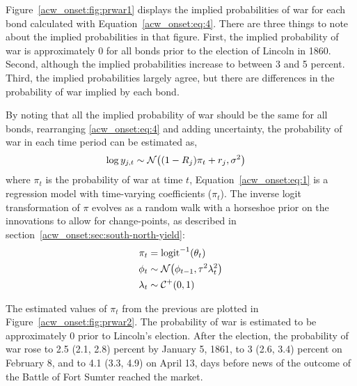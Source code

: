 Figure~\ref{acw_onset:fig:prwar1} displays the implied probabilities of war for each bond calculated with Equation~\eqref{acw_onset:eq:4}.
There are three things to note about the implied probabilities in that figure.
First, the implied probability of war is approximately 0 for all bonds prior to the election of Lincoln in 1860.
Second, although the implied probabilities increase to between 3 and 5 percent.
Third, the implied probabilities largely agree, but there are differences in the probability of war implied by each bond.

By noting that all the implied probability of war should be the same for all bonds, rearranging \eqref{acw_onset:eq:4} and adding uncertainty, the probability of war in each time period can be estimated as,
\begin{align}
  \label{acw_onset:eq:1}
  \log y_{j,t} & \sim \mathcal{N}\mathopen{}\left((1 - R_{j}) \pi_{t} + r_{j}, \sigma^{2}\right)\mathclose{}
\end{align}
where $\pi_{t}$ is the probability of war at time $t$,
Equation~\eqref{acw_onset:eq:1} is a regression model with time-varying coefficients ($\pi_{t}$).
The inverse logit transformation of $\pi$ evolves as a random walk with a horseshoe prior on the innovations to allow for change-points, as described  in section~\ref{acw_onset:sec:south-north-yield}:
\begin{align}
  \pi_{t} &= \operatorname{logit}^{-1}(\theta_{t}) \\
  \phi_{t} &\sim \mathcal{N}\mathopen{}\left(\phi_{t-1}, \tau^{2} \lambda_{t}^{2}\right)\mathclose{} \\
  \lambda_{t} &\sim \mathcal{C^+}\mathopen{}\left(0, 1\right)\mathclose{}
\end{align}

The estimated values of $\pi_{t}$ from the previous are plotted in Figure~\ref{acw_onset:fig:prwar2}.
The probability of war is estimated to be approximately 0 prior to Lincoln's election.
After the election, the probability of war rose to 2.5 (2.1, 2.8) percent by January 5, 1861,
to 3 (2.6, 3.4) percent on February 8, and to 4.1 (3.3, 4.9) on April 13, days before news of the outcome of the Battle of Fort Sumter reached the market.

